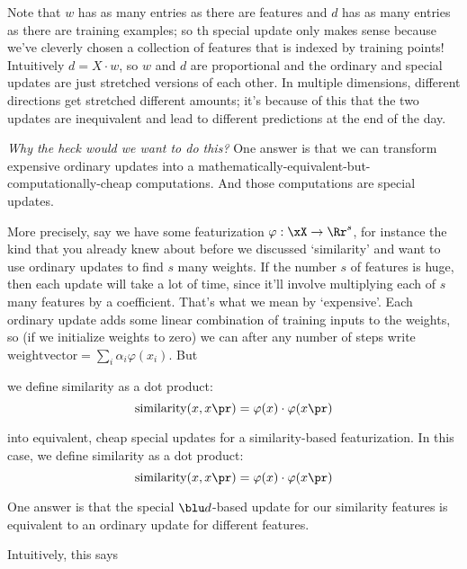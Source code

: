   Note that $w$ has as many entries as there are features and $d$ has as many
  entries as there are training examples; so th special update only makes sense
  because we've cleverly chosen a collection of features that is indexed by
  training points!
  Intuitively $d = X \cdot w$, so $w$ and $d$ are proportional and the
  ordinary and special updates are just stretched versions of each other.
  In multiple dimensions, different directions get stretched
  different amounts; it's because of this that the two updates are
  inequivalent and lead to different predictions at the end of the day.

  \emph{Why the heck would we want to do this?}
  One answer is that we can transform expensive ordinary updates into a
  mathematically-equivalent-but-computationally-cheap computations.  And those
  computations are special updates.

  More precisely, say we have some featurization $\varphi:\xX\to \Rr^s$, for
  instance the kind that you already knew about before we discussed
  `similarity' and want to use ordinary updates to find $s$ many weights.  If
  the number $s$ of features is huge, then each update will take a lot of time,
  since it'll involve multiplying each of $s$ many features by a coefficient.
  That's what we mean by `expensive'.
  Each ordinary update adds some linear combination of training inputs to the
  weights, so (if we initialize weights to zero) we can after any number of
  steps write $\text{weightvector} = \sum_i \alpha_i \varphi(x_i)$.  But

  we define similarity as a dot product:
  $$
    \text{similarity}(x,x\pr) = \varphi(x) \cdot \varphi(x\pr)
  $$ 


into equivalent, cheap special updates
  for a similarity-based featurization.
  In this case, we define similarity as a dot product:
  $$
    \text{similarity}(x,x\pr) = \varphi(x) \cdot \varphi(x\pr)
  $$ 

  One answer is that the special ${\blu d}$-based update for our similarity
  features is equivalent to an ordinary update for different features.

  Intuitively, this says 


